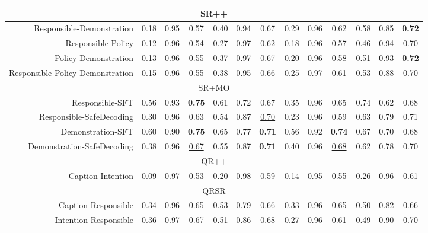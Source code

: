 \begin{table*}[!ht]
{\begin{tabular}{r|cccccc|cccccc}
        \midrule
        \midrule
        \multicolumn{13}{c}{SR++} \\
        \midrule        
        Responsible-Demonstration & 0.18 & 0.95 & 0.57 & 0.40 & 0.94 & 0.67 & 0.29 & 0.96 & 0.62 & 0.58 & 0.85 & \textbf{0.72} \\
        Responsible-Policy & 0.12 & 0.96 & 0.54 & 0.27 & 0.97 & 0.62 & 0.18 & 0.96 & 0.57 & 0.46 & 0.94 & 0.70 \\
        Policy-Demonstration & 0.13 & 0.96 & 0.55 & 0.37 & 0.97 & 0.67 & 0.20 & 0.96 & 0.58 &0.51 & 0.93 & \textbf{0.72}\\
        Responsible-Policy-Demonstration & 0.15 & 0.96 & 0.55 & 0.38 & 0.95 & 0.66 & 0.25 & 0.97 & 0.61 & 0.53 & 0.88 & 0.70\\
        \midrule
        \multicolumn{13}{c}{SR+MO} \\
        \midrule     
        Responsible-SFT & 0.56 & 0.93 & \textbf{0.75} & 0.61 & 0.72 & 0.67 & 0.35 & 0.96 & 0.65 & 0.74 & 0.62 & 0.68 \\
        Responsible-SafeDecoding & 0.30 & 0.96 & 0.63 & 0.54 & 0.87 & \underline{0.70} & 0.23 & 0.96 & 0.59 & 0.63 & 0.79 & 0.71\\
        Demonstration-SFT & 0.60 & 0.90 & \textbf{0.75} & 0.65 & 0.77 & \textbf{0.71} & 0.56 & 0.92 & \textbf{0.74} & 0.67 & 0.70 & 0.68\\
        Demonstration-SafeDecoding & 0.38 & 0.96 & \underline{0.67} & 0.55 & 0.87 & \textbf{0.71} & 0.40 & 0.96 & \underline{0.68} & 0.62 & 0.78 & 0.70\\
        \midrule
        \multicolumn{13}{c}{QR++} \\
        \midrule   
        Caption-Intention & 0.09 & 0.97 & 0.53 & 0.20 & 0.98 & 0.59 & 0.14 & 0.95 & 0.55 & 0.26 & 0.96 & 0.61\\
        \midrule
        \midrule
        \multicolumn{13}{c}{QR\textbar{}SR} \\
        \midrule   
        Caption-Responsible & 0.34 & 0.96 & 0.65 & 0.53 & 0.79 & 0.66 & 0.33 & 0.96 & 0.65 & 0.50 & 0.82 & 0.66\\
        Intention-Responsible & 0.36 & 0.97 & \underline{0.67} & 0.51 & 0.86 & 0.68 & 0.27 & 0.96 & 0.61 & 0.49 & 0.90 & 0.70\\

\end{tabular}}
\end{table*}

